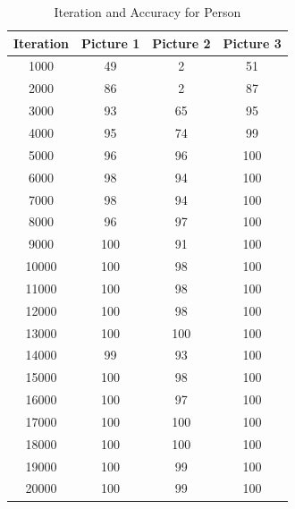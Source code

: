 \begin{table}[h!]
\centering
\begin{tabular}{|c|c|c|c|}
\hline
\textbf{Iteration} & \textbf{Picture 1} & \textbf{Picture 2} & \textbf{Picture 3} \\
\hline
1000 & 49 & 2 & 51 \\
2000 & 86 & 2 & 87 \\
3000 & 93 & 65 & 95 \\
4000 & 95 & 74 & 99 \\
5000 & 96 & 96 & 100 \\
6000 & 98 & 94 & 100 \\
7000 & 98 & 94 & 100 \\
8000 & 96 & 97 & 100 \\
9000 & 100 & 91 & 100 \\
10000 & 100 & 98 & 100 \\
11000 & 100 & 98 & 100 \\
12000 & 100 & 98 & 100 \\
13000 & 100 & 100 & 100 \\
14000 & 99 & 93 & 100 \\
15000 & 100 & 98 & 100 \\
16000 & 100 & 97 & 100 \\
17000 & 100 & 100 & 100 \\
18000 & 100 & 100 & 100 \\
19000 & 100 & 99 & 100 \\
20000 & 100 & 99 & 100 \\
\hline
\end{tabular}
\caption{Iteration and Accuracy for Person}
\end{table}

